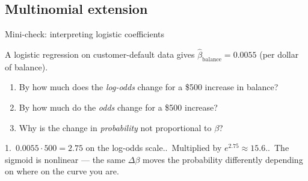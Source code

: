 \documentclass[aspectratio=169,11pt]{beamer}
\begin{document}
\subsection{Multinomial extension}



\begin{frame}{Mini-check: interpreting logistic coefficients}
  \begin{readme}
    A logistic regression on customer-default data gives
    $\hat\beta_{\text{balance}} = 0.0055$ (per dollar of balance).
    \begin{enumerate}
      \item By how much does the \emph{log-odds} change for a \$500
            increase in balance?
      \item By how much do the \emph{odds} change for a \$500 increase?
      \item Why is the change in \emph{probability} not
            proportional to $\beta$?
    \end{enumerate}
  \end{readme}
  \begin{takeaway}[Answers]
    1.\ $0.0055 \cdot 500 = 2.75$ on the log-odds scale..\ Multiplied by $e^{2.75} \approx 15.6$..\ The sigmoid is nonlinear --- the same $\Delta\beta$ moves the
        probability differently depending on where on the curve you are.
  \end{takeaway}
\end{frame}
\end{document}
